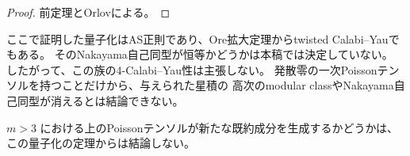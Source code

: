\begin{proof}
前定理とOrlov\cite[Corollary 2.7]{Orlov2009}による。
\end{proof}

ここで証明した量子化はAS正則であり、Ore拡大定理からtwisted Calabi--Yauでもある。
そのNakayama自己同型が恒等かどうかは本稿では決定していない。
したがって、この族の4-Calabi--Yau性は主張しない。
発散零の一次Poissonテンソルを持つことだけから、与えられた星積の
高次のmodular classやNakayama自己同型が消えるとは結論できない。

$m>3$ における上のPoissonテンソルが新たな既約成分を生成するかどうかは、
この量子化の定理からは結論しない。
